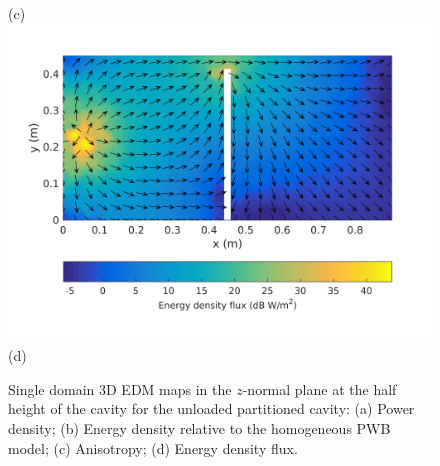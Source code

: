 \documentclass[a4paper]{article}
\numberwithin{equation}{section}
\begin{document}
\begin{figure}[ht]
\begin{center}
{\footnotesize (c)}\\
\vspace{2mm}
\includegraphics[trim={0 11mm 0 12mm},clip,width=0.52\linewidth]{figures/SDM_3D_DU_EnergyDensityFluxMap}\\
{\footnotesize (d)}\\
\vspace{-2mm}
\caption{\label{fg:partemptysdm_maps} Single domain 3D EDM maps in the $z$-normal plane at the half height of the cavity for the 
unloaded partitioned cavity: (a) Power density; (b) Energy density relative to the homogeneous PWB model;
(c) Anisotropy; (d) Energy density flux.}
\end{center}
\end{figure}
\end{document}
